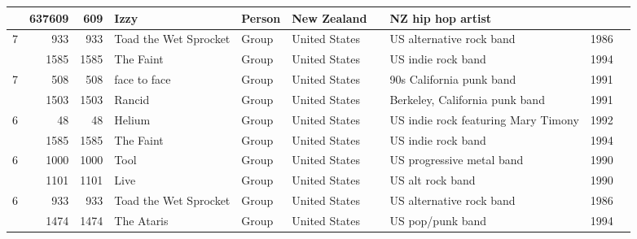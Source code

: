 \begin{tabular}{|r|rrlllllrr|}
         & 637609 &       609 & Izzy                  & Person & New Zealand    &          & NZ hip hop artist                   &              &            \\
\hline
\multirow{2}{*}{7} &    933 &       933 & Toad the Wet Sprocket & Group  & United States  &          & US alternative rock band            &         1986 &            \\
         &   1585 &      1585 & The Faint             & Group  & United States  &          & US indie rock band                  &         1994 &            \\
\hline
\multirow{2}{*}{7} &    508 &       508 & face to face          & Group  & United States  &          & 90s California punk band            &         1991 &            \\
         &   1503 &      1503 & Rancid                & Group  & United States  &          & Berkeley, California punk band      &         1991 &            \\
\hline
\multirow{2}{*}{6} &     48 &        48 & Helium                & Group  & United States  &          & US indie rock featuring Mary Timony &         1992 &            \\
          &   1585 &      1585 & The Faint             & Group  & United States  &          & US indie rock band                  &         1994 &            \\
\hline
\multirow{2}{*}{6} &   1000 &      1000 & Tool                  & Group  & United States  &          & US progressive metal band           &         1990 &            \\
          &   1101 &      1101 & Live                  & Group  & United States  &          & US alt rock band                    &         1990 &            \\
\hline
\multirow{2}{*}{6} &    933 &       933 & Toad the Wet Sprocket & Group  & United States  &          & US alternative rock band            &         1986 &            \\
          &   1474 &      1474 & The Ataris            & Group  & United States  &          & US pop/punk band                    &         1994 &            \\
\hline
\end{tabular}
